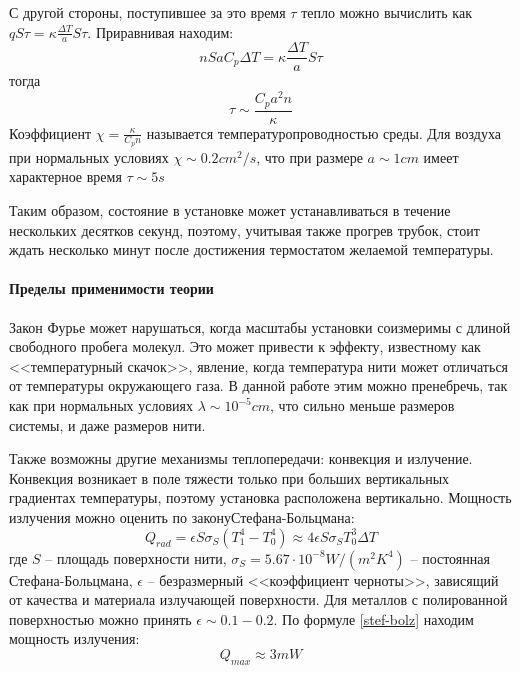 \documentclass[a4paper,12pt]{report}
\begin{document}
    С другой стороны, поступившее за это время $\tau$ тепло можно вычислить как $qS\tau=\kappa\frac{\Delta T}{a}S\tau$. Приравнивая находим:
    \begin{equation*}
        nSaC_p\Delta T=\kappa\frac{\Delta T}{a}S\tau
    \end{equation*}
    тогда
    \begin{equation}
        \label{tau}
        \tau\sim\frac{C_pa^2n}{\kappa}
    \end{equation}
    Коэффициент $\chi=\frac{\kappa}{C_pn}$ называется температуропроводностью среды. Для воздуха при нормальных условиях $\chi\sim 0.2cm^2/s$, что при размере $a\sim 1cm$ имеет характерное время $\tau\sim 5s$

    Таким образом, состояние в установке может устанавливаться в течение нескольких десятков секунд, поэтому, учитывая также прогрев трубок, стоит ждать несколько минут после достижения термостатом желаемой температуры.

    \paragraph*{Пределы применимости теории} Закон Фурье может нарушаться, когда масштабы установки соизмеримы с длиной свободного пробега молекул. Это может привести к эффекту, известному как <<температурный скачок>>, явление, когда температура нити может отличаться от температуры окружающего газа. В данной работе этим можно пренебречь, так как при нормальных условиях $\lambda\sim 10^{-5}cm$, что сильно меньше размеров системы, и даже размеров нити.

    Также возможны другие механизмы теплопередачи: конвекция и излучение. Конвекция возникает в поле тяжести только при больших вертикальных градиентах температуры, поэтому установка расположена вертикально. Мощность излучения можно оценить по закону\newline Стефана-Больцмана:
    \begin{equation}
        \label{stef-bolz}
        Q_{rad}=\epsilon S \sigma_S(T_1^4-T_0^4)\approx 4\epsilon S\sigma_ST_0^3\Delta T
    \end{equation}
    где $S$ -- площадь поверхности нити, $\sigma_S=5.67\cdot 10^{-8}W/(m^2K^4)$ -- постоянная Стефана-Больцмана, $\epsilon$ -- безразмерный <<коэффициент черноты>>, зависящий от качества и материала излучающей поверхности. Для металлов с полированной поверхностью можно принять $\epsilon\sim 0.1-0.2$. По формуле \eqref{stef-bolz} находим мощность излучения:
    \begin{equation*}
        Q_{max} \approx 3mW
    \end{equation*}
\end{document}
